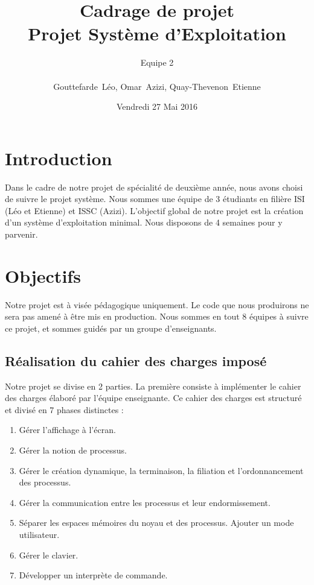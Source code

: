 \documentclass[a4paper, 11pt, titlepage]{article}
\title {{ {\Huge Cadrage de projet }} \\\vspace{0.1cm}
Projet Système d'Exploitation }
\author{\Large Equipe 2 \\
\\
    {\sc Gouttefarde}~Léo,
    {\sc Omar}~Azizi,
    {\sc Quay-Thevenon}~Etienne
}
\date{Vendredi 27 Mai 2016}
\begin{document}
\pagestyle{fancy}
\maketitle

\tableofcontents

\newpage



\section{Introduction}

Dans le cadre de notre projet de spécialité de deuxième année, nous avons choisi de suivre le projet système. Nous sommes une équipe de 3 étudiants en filière ISI (Léo et Etienne) et ISSC (Azizi). L'objectif global de notre projet est la création d'un système d'exploitation minimal. Nous disposons de 4 semaines pour y parvenir.

\section{Objectifs}

Notre projet est à visée pédagogique uniquement. Le code que nous produirons ne sera pas amené à être mis en production. Nous sommes en tout 8 équipes à suivre ce projet, et sommes guidés par un groupe d'enseignants.


\subsection{Réalisation du cahier des charges imposé}

Notre projet se divise en 2 parties. La première consiste à implémenter le cahier des charges élaboré par l'équipe enseignante. Ce cahier des charges est structuré et divisé en 7 phases distinctes :

\begin{enumerate}
\item
Gérer l'affichage à l'écran.

\item
Gérer la notion de processus.

\item
Gérer le création dynamique, la terminaison, la filiation et l'ordonnancement des processus. 

\item
Gérer la communication entre les processus et leur endormissement.

\item
Séparer les espaces mémoires du noyau et des processus. Ajouter un mode utilisateur.

\item
Gérer le clavier.

\item
Développer un interprète de commande.
\end{enumerate}
\end{document}
